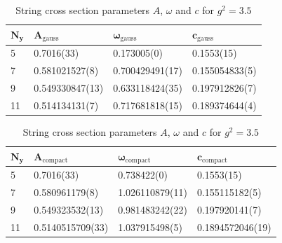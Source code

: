 \begin{table}[!hb]
\centering
\begin{tabular}{llll}
    $\mathbf{N_y}$ & $\mathbf{A_\mathrm{gauss}}$ & $\mathbf{\omega_\mathrm{gauss}}$ & $\mathbf{c_\mathrm{gauss}}$ \\ \hline
   5 & 0.7016(33) & 0.173005(0) & 0.1553(15) \\
   7 & 0.581021527(8) & 0.700429491(17) & 0.155054833(5) \\
   9 & 0.549330847(13) & 0.633118424(35) & 0.197912826(7) \\
   11 & 0.514134131(7) & 0.717681818(15) & 0.189374644(4) \\
\end{tabular}
\begin{tabular}{llll}
    $\mathbf{N_y}$ & $\mathbf{A_\mathrm{compact}}$ & $\mathbf{\omega_\mathrm{compact}}$ & $\mathbf{c_\mathrm{compact}}$ \\ \hline
   5 & 0.7016(33) & 0.738422(0) & 0.1553(15) \\
   7 & 0.580961179(8) & 1.026110879(11) & 0.155115182(5) \\
   9 & 0.549323532(13) & 0.981483242(22) & 0.197920141(7) \\
   11 & 0.5140515709(33) & 1.037915498(5) & 0.1894572046(19) \\
\end{tabular}
\caption{String cross section parameters $A$, $\omega$ and $c$ for $g^2=3.5$}
\end{table}
